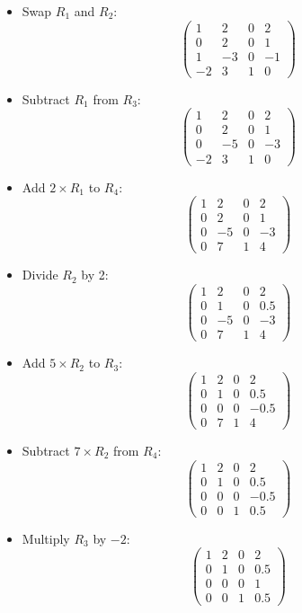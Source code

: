\documentclass{article}
\begin{document}
\begin{itemize}
    \item Swap \( R_1 \) and \( R_2 \):
          \[
              \begin{pmatrix} 1 & 2 & 0 & 2 \\ 0 & 2 & 0 & 1 \\ 1 & -3 & 0 & -1 \\ -2 & 3 & 1 & 0 \end{pmatrix}
          \]

    \item Subtract \( R_1 \) from \( R_3 \):
          \[
              \begin{pmatrix} 1 & 2 & 0 & 2 \\ 0 & 2 & 0 & 1 \\ 0 & -5 & 0 & -3 \\ -2 & 3 & 1 & 0 \end{pmatrix}
          \]

    \item Add \( 2 \times R_1 \) to \( R_4 \):
          \[
              \begin{pmatrix} 1 & 2 & 0 & 2 \\ 0 & 2 & 0 & 1 \\ 0 & -5 & 0 & -3 \\ 0 & 7 & 1 & 4 \end{pmatrix}
          \]

    \item Divide \( R_2 \) by 2:
          \[
              \begin{pmatrix} 1 & 2 & 0 & 2 \\ 0 & 1 & 0 & 0.5 \\ 0 & -5 & 0 & -3 \\ 0 & 7 & 1 & 4 \end{pmatrix}
          \]

    \item Add \( 5 \times R_2 \) to \( R_3 \):
          \[
              \begin{pmatrix} 1 & 2 & 0 & 2 \\ 0 & 1 & 0 & 0.5 \\ 0 & 0 & 0 & -0.5 \\ 0 & 7 & 1 & 4 \end{pmatrix}
          \]

    \item Subtract \( 7 \times R_2 \) from \( R_4 \):
          \[
              \begin{pmatrix} 1 & 2 & 0 & 2 \\ 0 & 1 & 0 & 0.5 \\ 0 & 0 & 0 & -0.5 \\ 0 & 0 & 1 & 0.5 \end{pmatrix}
          \]

    \item Multiply \( R_3 \) by \(-2\):
          \[
              \begin{pmatrix} 1 & 2 & 0 & 2 \\ 0 & 1 & 0 & 0.5 \\ 0 & 0 & 0 & 1 \\ 0 & 0 & 1 & 0.5 \end{pmatrix}
          \]
\end{itemize}
\end{document}
